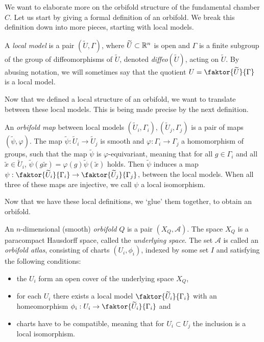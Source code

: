 We want to elaborate more on the orbifold structure of the fundamental chamber \(C\).
Let us start by giving a formal definition of an orbifold.
We break this definition down into more pieces, starting with local models.

\begin{definition}
    A \emph{local model} is a pair \((\widetilde{U}, \Gamma)\), where \(\widetilde{U} \subset \mathbb{R}^n\) is open and \(\Gamma\) is a finite subgroup of the group of diffeomorphisms of \(\widetilde{U}\), denoted \emph{diffeo}\((\widetilde{U})\), acting on \(\widetilde{U}\).
    By abusing notation, we will sometimes say that the quotient \(U = \faktor{\widetilde{U}}{\Gamma}\;\) is a local model.
\end{definition}

Now that we defined a local structure of an orbifold, we want to translate between these local models.
This is being made precise by the next definition.

\begin{definition}
    An \emph{orbifold map} between local models \((\widetilde{U}_i, \Gamma_i), (\widetilde{U}_j, \Gamma_j)\) is a pair of maps \((\widetilde{\psi}, \varphi)\).
    The map \(\widetilde{\psi} : \widetilde{U}_i \to \widetilde{U}_j\) is smooth and \(\varphi : \Gamma_i \to \Gamma_j\) a homomorphism of groups, such that the map \(\widetilde{\psi}\) is \(\varphi\)-equivariant, meaning that for all \(g \in \Gamma_i\) and all \(\widetilde{x} \in \widetilde{U}_i\), \(\widetilde{\psi}(g\widetilde{x}) = \varphi(g)\widetilde{\psi}(\widetilde{x})\) holds.
    Then \(\widetilde{\psi}\) induces a map \(\psi : \faktor{\widetilde{U}_i}{\Gamma_i} \to \faktor{\widetilde{U}_j}{\Gamma_j}\), between the local models.
    When all three of these maps are injective, we call \(\psi\) a local isomorphism.
\end{definition}

Now that we have these local definitions, we `glue' them together, to obtain an orbifold.

\begin{definition}
    An \(n\)-dimensional (smooth) \emph{orbifold} \(Q\) is a pair \((X_Q, \mathcal{A})\).
    The space \(X_Q\) is a paracompact Hausdorff space, called the \emph{underlying space}.
    The set \(\mathcal{A}\) is called an \emph{orbifold atlas}, consisting of charts \((U_i, \phi_i)\), indexed by some set \(I\) and satisfying the following conditions:
    \begin{itemize}
        \item the \(U_i\) form an open cover of the underlying space \(X_Q\),
        \item for each \(U_i\) there exists a local model \(\faktor{\widetilde{U}_i}{\Gamma_i}\) with an homeomorphism \(\phi_i : U_i \to \faktor{\widetilde{U}_i}{\Gamma_i}\) and
        \item charts have to be compatible, meaning that for \(U_i \subset U_j\) the inclusion is a local isomorphism.
    \end{itemize}
\end{definition}

